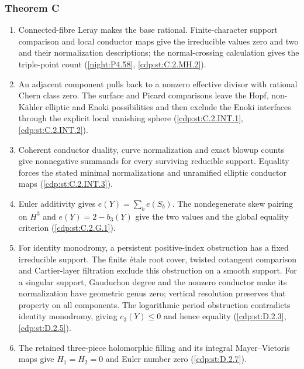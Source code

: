 \subsubsection*{Theorem C}
\begin{enumerate}[label=\arabic*.,leftmargin=*]
\item\hypertarget{step-II-C-1}{} Connected-fibre Leray makes the
base rational. Finite-character support comparison and local
conductor maps give the irreducible values zero and two and their
normalization descriptions; the normal-crossing calculation gives
the triple-point count
(\hyperref[night:P4.58]{\ref*{night:P4.58}},
\hyperref[cdp:st:C.2.MH.2]{\ref*{cdp:st:C.2.MH.2}}).
\item\hypertarget{step-II-C-2}{} An adjacent component pulls back
to a nonzero effective divisor with rational Chern class zero.
The surface and Picard comparisons leave the Hopf, non-K\"ahler
elliptic and Enoki possibilities and then exclude the Enoki
interfaces through the explicit local vanishing sphere
(\hyperref[cdp:st:C.2.INT.1]{\ref*{cdp:st:C.2.INT.1}},
\hyperref[cdp:st:C.2.INT.2]{\ref*{cdp:st:C.2.INT.2}}).
\item\hypertarget{step-II-C-3}{} Coherent conductor duality, curve
normalization and exact blowup counts give nonnegative summands
for every surviving reducible support. Equality forces the stated
minimal normalizations and unramified elliptic conductor maps
(\hyperref[cdp:st:C.2.INT.3]{\ref*{cdp:st:C.2.INT.3}}).
\item\hypertarget{step-II-C-4}{} Euler additivity gives
$e(Y)=\sum_b e(S_b)$. The nondegenerate skew pairing on $H^3$
and $e(Y)=2-b_3(Y)$ give the two values and the global equality
criterion (\hyperref[cdp:st:C.2.G.1]{\ref*{cdp:st:C.2.G.1}}).
\item\hypertarget{step-II-C-5}{} For identity monodromy, a
persistent positive-index obstruction has a fixed irreducible
support. The finite \'etale root cover, twisted cotangent
comparison and Cartier-layer filtration exclude this obstruction
on a smooth support. For a singular support, Gauduchon degree
and the nonzero conductor make its normalization have geometric
genus zero; vertical resolution preserves that property on all
components. The logarithmic
period obstruction contradicts identity monodromy, giving
$c_3(Y)\le0$ and hence equality
(\hyperref[cdp:st:D.2.3]{\ref*{cdp:st:D.2.3}},
\hyperref[cdp:st:D.2.5]{\ref*{cdp:st:D.2.5}}).
\item\hypertarget{step-II-C-6}{} The retained three-piece
holomorphic filling and its integral Mayer--Vietoris maps give
$H_1=H_2=0$ and Euler number zero
(\hyperref[cdp:st:D.2.7]{\ref*{cdp:st:D.2.7}}).
\end{enumerate}

